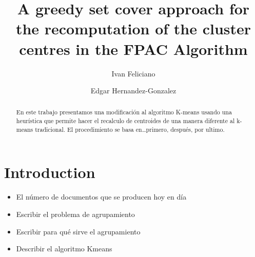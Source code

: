 \documentclass[runningheads]{llncs}
\begin{document}
%
\title{A greedy set cover approach for the recomputation of the cluster centres in the FPAC Algorithm}


\author{Ivan Feliciano \and
Edgar Hernandez-Gonzalez}
%
%
\maketitle              %
\begin{abstract}
En este trabajo presentamos una modificación al algoritmo K-means usando una heurística que permite hacer el recalculo de centroides de una manera diferente al k-means tradicional. El procedimiento se basa en…primero, después, por ultimo.

\end{abstract}
%
%
%
\section{Introduction}


\begin{itemize}

\item El número de documentos que se producen hoy en día
\item Escribir el problema de agrupamiento
\item Escribir para qué sirve el agrupamiento
\item Describir el algoritmo Kmeans

\end{itemize}
\end{document}
